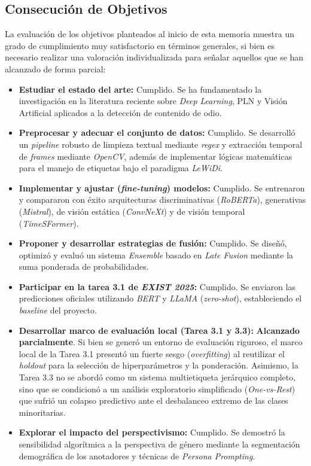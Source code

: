 \subsection*{Consecución de Objetivos}
La evaluación de los objetivos planteados al inicio de esta memoria muestra un grado de cumplimiento muy satisfactorio en términos generales, si bien es necesario realizar una valoración individualizada para señalar aquellos que se han alcanzado de forma parcial:
\begin{itemize}
    \item \textbf{Estudiar el estado del arte:} Cumplido. Se ha fundamentado la investigación en la literatura reciente sobre \textit{Deep Learning}, PLN y Visión Artificial aplicados a la detección de contenido de odio.
    \item \textbf{Preprocesar y adecuar el conjunto de datos:} Cumplido. Se desarrolló un \textit{pipeline} robusto de limpieza textual mediante \textit{regex} y extracción temporal de \textit{frames} mediante \textit{OpenCV}, además de implementar lógicas matemáticas para el manejo de etiquetas bajo el paradigma \textit{LeWiDi}.
    \item \textbf{Implementar y ajustar (\textit{fine-tuning}) modelos:} Cumplido. Se entrenaron y compararon con éxito arquitecturas discriminativas (\textit{RoBERTa}), generativas (\textit{Mistral}), de visión estática (\textit{ConvNeXt}) y de visión temporal (\textit{TimeSFormer}).
    \item \textbf{Proponer y desarrollar estrategias de fusión:} Cumplido. Se diseñó, optimizó y evaluó un sistema \textit{Ensemble} basado en \textit{Late Fusion} mediante la suma ponderada de probabilidades.
    \item \textbf{Participar en la tarea 3.1 de \textit{EXIST 2025}:} Cumplido. Se enviaron las predicciones oficiales utilizando \textit{BERT} y \textit{LLaMA} (\textit{zero-shot}), estableciendo el \textit{baseline} del proyecto.
    \item \textbf{Desarrollar marco de evaluación local (Tarea 3.1 y 3.3):} \textbf{Alcanzado parcialmente}. Si bien se generó un entorno de evaluación riguroso, el marco local de la Tarea 3.1 presentó un fuerte sesgo (\textit{overfitting}) al reutilizar el \textit{holdout} para la selección de hiperparámetros y la ponderación. Asimismo, la Tarea 3.3 no se abordó como un sistema multietiqueta jerárquico completo, sino que se condicionó a un análisis exploratorio simplificado (\textit{One-vs-Rest}) que sufrió un colapso predictivo ante el desbalanceo extremo de las clases minoritarias.
    \item \textbf{Explorar el impacto del perspectivismo:} Cumplido. Se demostró la sensibilidad algorítmica a la perspectiva de género mediante la segmentación demográfica de los anotadores y técnicas de \textit{Persona Prompting}.
\end{itemize}

